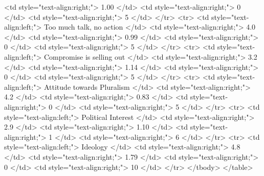    <td style="text-align:right;"> 1.00 </td>
   <td style="text-align:right;"> 0 </td>
   <td style="text-align:right;"> 5 </td>
  </tr>
  <tr>
   <td style="text-align:left;"> Too much talk, no action </td>
   <td style="text-align:right;"> 4.0 </td>
   <td style="text-align:right;"> 0.99 </td>
   <td style="text-align:right;"> 0 </td>
   <td style="text-align:right;"> 5 </td>
  </tr>
  <tr>
   <td style="text-align:left;"> Compromise is selling out </td>
   <td style="text-align:right;"> 3.2 </td>
   <td style="text-align:right;"> 1.14 </td>
   <td style="text-align:right;"> 0 </td>
   <td style="text-align:right;"> 5 </td>
  </tr>
  <tr>
   <td style="text-align:left;"> Attitude towards Pluralism </td>
   <td style="text-align:right;"> 4.2 </td>
   <td style="text-align:right;"> 0.83 </td>
   <td style="text-align:right;"> 0 </td>
   <td style="text-align:right;"> 5 </td>
  </tr>
  <tr>
   <td style="text-align:left;"> Political Interest </td>
   <td style="text-align:right;"> 2.9 </td>
   <td style="text-align:right;"> 1.10 </td>
   <td style="text-align:right;"> 1 </td>
   <td style="text-align:right;"> 6 </td>
  </tr>
  <tr>
   <td style="text-align:left;"> Ideology </td>
   <td style="text-align:right;"> 4.8 </td>
   <td style="text-align:right;"> 1.79 </td>
   <td style="text-align:right;"> 0 </td>
   <td style="text-align:right;"> 10 </td>
  </tr>
</tbody>
</table>
